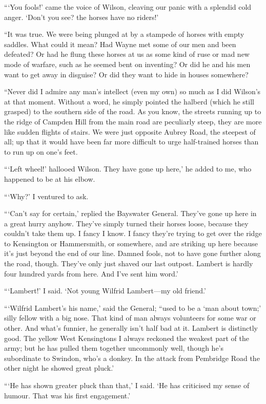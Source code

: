 \documentclass{book}
\begin{document}
“‘You fools!’ came the voice of Wilson, cleaving our panic with a splendid cold anger. ‘Don’t you see? the horses have no riders!’

“It was true. We were being plunged at by a stampede of horses with empty saddles. What could it mean? Had Wayne met some of our men and been defeated? Or had he flung these horses at us as some kind of ruse or mad new mode of warfare, such as he seemed bent on inventing? Or did he and his men want to get away in disguise? Or did they want to hide in houses somewhere?

“Never did I admire any man’s intellect (even my own) so much as I did Wilson’s at that moment. Without a word, he simply pointed the halberd (which he still grasped) to the southern side of the road. As you know, the streets running up to the ridge of Campden Hill from the main road are peculiarly steep, they are more like sudden flights of stairs. We were just opposite Aubrey Road, the steepest of all; up that it would have been far more difficult to urge half-trained horses than to run up on one’s feet.

“‘Left wheel!’ hallooed Wilson. They have gone up here,’ he added to me, who happened to be at his elbow.

“‘Why?’ I ventured to ask.

“‘Can’t say for certain,’ replied the Bayswater General. They’ve gone up here in a great hurry anyhow. They’ve simply turned their horses loose, because they couldn’t take them up. I fancy I know. I fancy they’re trying to get over the ridge to Kensington or Hammersmith, or somewhere, and are striking up here because it’s just beyond the end of our line. Damned fools, not to have gone further along the road, though. They’ve only just shaved our last outpost. Lambert is hardly four hundred yards from here. And I’ve sent him word.’

“‘Lambert!’ I said. ‘Not young Wilfrid Lambert—my old friend.’

“‘Wilfrid Lambert’s his name,’ said the General; “used to be a ‘man about town;’ silly fellow with a big nose. That kind of man always volunteers for some war or other. And what’s funnier, he generally isn’t half bad at it. Lambert is distinctly good. The yellow West Kensingtons I always reckoned the weakest part of the army; but he has pulled them together uncommonly well, though he’s subordinate to Swindon, who’s a donkey. In the attack from Pembridge Road the other night he showed great pluck.’

“‘He has shown greater pluck than that,’ I said. ‘He has criticised my sense of humour. That was his first engagement.’
\end{document}
